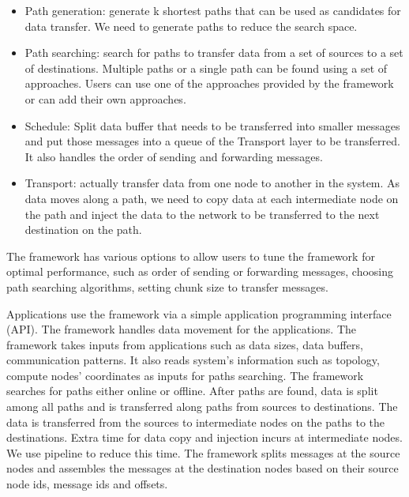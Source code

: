 \begin{itemize}
\item Path generation: generate k shortest paths that can be used as candidates for data transfer. We need to generate paths to reduce the search space.
\item Path searching: search for paths to transfer data from a set of sources to a set of destinations. Multiple paths or a single path can be found using a set of approaches. Users can use one of the approaches provided by the framework or can add their own approaches.
\item Schedule: Split data buffer that needs to be transferred into smaller messages and put those messages into a queue of the Transport layer to be transferred. It also handles the order of sending and forwarding messages.
\item Transport: actually transfer data from one node to another in the system. As data moves along a path, we need to copy data at each intermediate node on the path and inject the data to the network to be transferred to the next destination on the path.
\end{itemize}
The framework has various options to allow users to tune the framework for optimal performance, such as order of sending or forwarding messages, choosing path searching algorithms, setting chunk size to transfer messages. 

Applications use the framework via a simple application programming interface (API). The framework handles data movement for the applications. The framework takes inputs from applications such as data sizes, data buffers, communication patterns. It also reads system's information such as topology, compute nodes' coordinates as inputs for paths searching. The framework searches for paths either online or offline. After paths are found, data is split among all paths and is transferred along paths from sources to destinations. The data is transferred from the sources to intermediate nodes on the paths to the destinations. Extra time for data copy and injection incurs at intermediate nodes. We use pipeline to reduce this time. The framework splits messages at the source nodes and assembles the messages at the destination nodes based on their source node ids, message ids and offsets.
